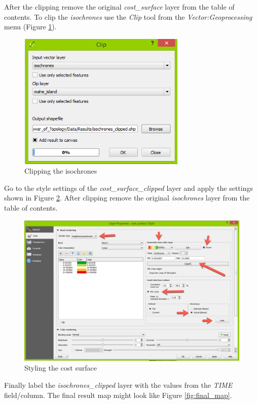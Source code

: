 \documentclass[a4paper,12pt,titlepage]{article}
\begin{document}
After the clipping remove the original \textit{cost\_surface} layer from the table of contents. To clip the \textit{isochrones} use the \textit{Clip} tool from the \textit{Vector:Geoprocessing} menu (Figure \ref{fig:clip_isochrones}).

\begin{figure}[htb]
	\centering
	\includegraphics[width=8cm]{Images/clip_isochrones.png}
	\caption{Clipping the isochrones}\label{fig:clip_isochrones}
\end{figure}

Go to the style settings of the \textit{cost\_surface\_clipped} layer and apply the settings shown in Figure \ref{fig:cost_surface_style}. After clipping remove the original \textit{isochrones} layer from the table of contents.

\begin{figure}[htb]
	\centering
	\includegraphics[width=12cm]{Images/cost_surface_style.png}
	\caption{Styling the cost surface}\label{fig:cost_surface_style}
\end{figure}

Finally label the \textit{isochrones\_clipped} layer with the values from the \textit{TIME} field/column. The final result map might look like Figure \ref{fig:final_map}.
\end{document}
